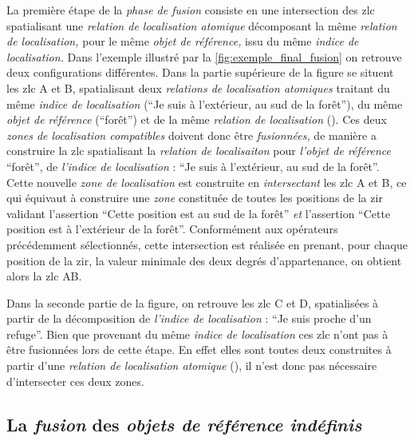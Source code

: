 La première étape de la \emph{phase de fusion} consiste en une
intersection des \ac{zlc} spatialisant une \emph{relation de
  localisation atomique} décomposant la même \emph{relation de
  localisation,} pour le même \emph{objet de référence,} issu du même
\emph{indice de localisation.} Dans l'exemple illustré par la
\autoref{fig:exemple_final_fusion} on retrouve deux configurations
différentes. Dans la partie supérieure de la figure se situent les
\ac{zlc} \textcolor{RdBu-9-1}{\textsf{A}} et
\textcolor{RdBu-9-2}{\textsf{B}}, spatialisant deux \emph{relations de
  localisation atomiques} traitant du même \emph{indice de
  localisation} (\enquote{Je suis à l'extérieur, au sud de la forêt}),
du même \emph{objet de référence} (\enquote{forêt}) et de la même
\emph{relation de localisation}
(). Ces deux \emph{zones de
  localisation compatibles} doivent donc être \emph{fusionnées,} de
manière a construire la \ac{zlc} spatialisant la \emph{relation de
  localisaiton}  pour
\emph{l'objet de référence} \enquote{forêt}, de \emph{l'indice de
  localisation} : \enquote{Je suis à l'extérieur, au sud de la
  forêt}. Cette nouvelle \emph{zone de localisation} est construite en
\emph{intersectant} les \ac{zlc} \textcolor{RdBu-9-1}{\textsf{A}} et
\textcolor{RdBu-9-2}{\textsf{B}}, ce qui équivaut à construire une
\emph{zone} constituée de toutes les positions de la \ac{zir} validant
l'assertion \enquote{Cette position est au sud de la forêt} \emph{et}
l'assertion \enquote{Cette position est à l'extérieur de la
  forêt}. Conformément aux opérateurs précédemment sélectionnés, cette
intersection est réalisée en prenant, pour chaque position de la
\ac{zir}, la valeur minimale des deux degrés d'appartenance, on
obtient alors la \ac{zlc} \textcolor{RdBu-9-1}{\textsf{AB}}.

Dans la seconde partie de la figure, on retrouve les \ac{zlc}
\textcolor{RdBu-9-8}{\textsf{C}} et \textcolor{RdBu-9-9}{\textsf{D}},
spatialisées à partir de la décomposition de \emph{l'indice de
  localisation} : \enquote{Je suis proche d'un refuge}. Bien que
provenant du même \emph{indice de localisation} ces \ac{zlc} n'ont pas
à être fusionnées lors de cette étape. En effet elles sont toutes deux
construites à partir d'une \emph{relation de localisation atomique}
(), il n'est donc pas nécessaire d'intersecter
ces deux zones.

\subsection{La \emph{fusion} des \emph{objets de référence indéfinis}}

